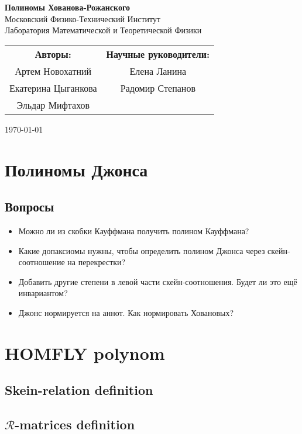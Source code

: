 \documentclass[12pt,a4paper]{article}
\begin{document}
\begin{center}
    \Large \textbf{Полиномы Хованова-Рожанского} \\[1em]
    \small
    Московский Физико-Технический Институт \\[0.5em]
    Лаборатория Математической и Теоретической Физики
\end{center}

\small
\begin{flushright}
\begin{tabular}{c c}
\textbf{Авторы:} & \textbf{Научные руководители:} \\[0.5em]
Артем Новохатний & Елена Ланина \\
Екатерина Цыганкова & Радомир Степанов \\
Эльдар Мифтахов & \\
\end{tabular}

\vspace{1em}

\today
\end{flushright}
\normalsize
\vspace{2em}


\tableofcontents
\vspace{2em}

\section{Полиномы Джонса}

\subsection{Вопросы}
\begin{itemize}
    \item  Можно ли из скобки Кауффмана получить полином Кауффмана?
    \item  Какие допаксиомы нужны, чтобы определить полином Джонса через скейн-соотношение на перекрестки?
    \item  Добавить другие степени в левой части скейн-соотношения. Будет ли это ещё инвариантом?
    \item Джонс нормируется на аннот. Как нормировать Ховановых?
\end{itemize}

\section{HOMFLY polynom}
\subsection{Skein-relation definition}

\subsection{$\mathcal{R}$-matrices definition}



\printbibliography
\end{document}
